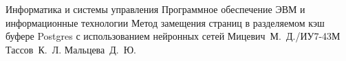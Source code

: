 \documentclass{bmstu}
\begin{document}
\makethesistitle
{Информатика и системы управления} %
{Программное обеспечение ЭВМ и информационные технологии} %
{Метод замещения страниц в разделяемом кэш буфере Postgres с использованием нейронных сетей} %
{Мицевич~М.~Д./ИУ7-43М} %
{Тассов~К.~Л.} %
{} %
{Мальцева~Д.~Ю.} %



\maketableofcontents

%
%








\makebibliography


\end{document}
